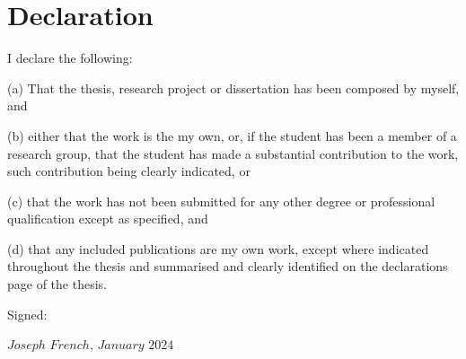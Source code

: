 \section{Declaration}

I declare the following:

(a) That the thesis, research project or dissertation has been composed by myself, and

(b) either that the work is the my own, or, if the student has been a member of a research group, that the student has made a substantial contribution to the work, such contribution being clearly indicated, or

(c) that the work has not been submitted for any other degree or professional qualification except as specified, and

(d) that any included publications are my own work, except where indicated throughout the thesis and summarised and clearly identified on the declarations page of the thesis.

Signed:

$Joseph$ $French$, 
$January$ $2024$